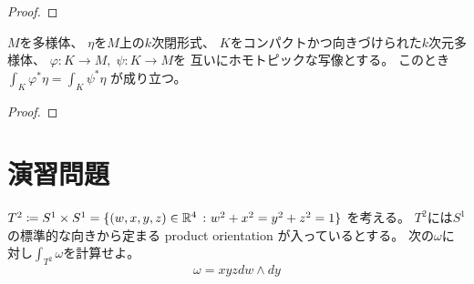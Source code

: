 \documentclass[report]{jlreq}
\begin{document}
\begin{proof}
    \TODO{}
\end{proof}

\begin{proposition}
    $M$を多様体、
    $\eta$を$M$上の$k$次閉形式、
    $K$をコンパクトかつ向きづけられた$k$次元多様体、
    $\varphi \colon K \to M, \; \psi \colon K \to M$を
    互いに{\smooth}ホモトピックな{\smooth}写像とする。
    このとき
    $\int_K \varphi^* \eta = \int_K \psi^* \eta$
    が成り立つ。
\end{proposition}

\begin{proof}
    \TODO{}
\end{proof}



%
\section{演習問題}

\begin{problem}[{[Lee] 16-2}]
    $T^2 \coloneqq S^1 \times S^1 = \{ (w, x, y, z) \in \mathbb{R}^4\ \colon w^2 + x^2 = y^2 + z^2 = 1 \}$
    を考える。
    $T^2$には$S^1$の標準的な向きから定まる product orientation が入っているとする。
    次の$\omega$に対し$\int_{T^2} \omega$を計算せよ。
    \begin{equation}
        \omega = xyz dw \wedge dy
    \end{equation}
\end{problem}
\end{document}
